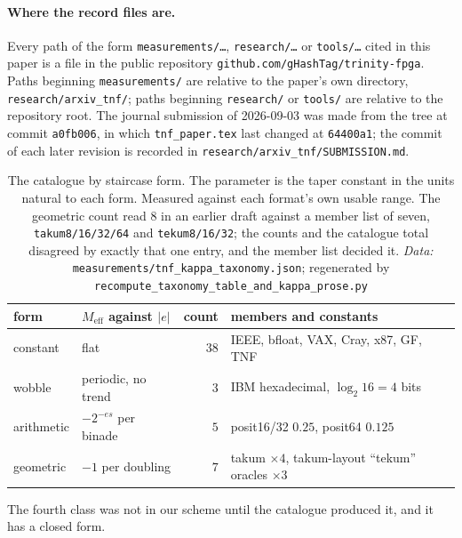 \paragraph{Where the record files are.} Every path of the form \texttt{measurements/\ldots}, \texttt{research/\ldots} or \texttt{tools/\ldots} cited in this paper is a file in the public repository \texttt{github.com/\allowbreak gHashTag/\allowbreak trinity-fpga}. Paths beginning \texttt{measurements/} are relative to the paper's own directory, \texttt{research/arxiv\_tnf/}; paths beginning \texttt{research/} or \texttt{tools/} are relative to the repository root. The journal submission of 2026-09-03 was made from the tree at commit \texttt{a0fb006}, in which \texttt{tnf\_paper.tex} last changed at \texttt{64400a1}; the commit of each later revision is recorded in \texttt{research/\allowbreak arxiv\_\allowbreak tnf/\allowbreak SUBMISSION.md}.

\begin{table}[t]\centering
\caption{The catalogue by staircase form. The parameter is the taper constant in
the units natural to each form. Measured against each format's own usable range.
The geometric count read $8$ in an earlier draft against a member list of seven,
\texttt{takum8/16/32/64} and \texttt{tekum8/16/32}; the counts and the catalogue
total disagreed by exactly that one entry, and the member list decided it. \emph{Data:} \texttt{measurements/\allowbreak tnf\_\allowbreak kappa\_\allowbreak taxonomy.json}; regenerated by \texttt{recompute\_\allowbreak taxonomy\_\allowbreak table\_\allowbreak and\_\allowbreak kappa\_\allowbreak prose.py}}
\label{tab:taxonomy}
\begin{tabular}{llrl}
\toprule
form & $M_{\mathrm{eff}}$ against $|e|$ & count & members and constants \\
\midrule
constant   & flat                          & $38$ & IEEE, bfloat, VAX, Cray, x87, GF, TNF \\
wobble     & periodic, no trend            & $3$  & IBM hexadecimal, $\log_2 16 = 4$ bits \\
arithmetic & $-2^{-es}$ per binade         & $5$  & posit16/32 $0.25$, posit64 $0.125$ \\
geometric  & $-1$ per doubling             & $7$  & takum $\times 4$, takum-layout ``tekum'' oracles $\times 3$ \\
\bottomrule
\end{tabular}
\end{table}

The fourth class was not in our scheme until the catalogue produced it, and it has
a closed form.

